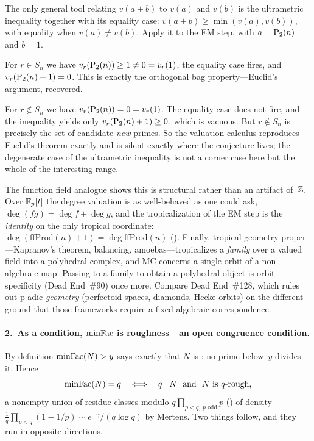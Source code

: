 \begin{remark}
\label{rem:tropical}
The only general tool relating $v(a+b)$ to $v(a)$ and $v(b)$ is the
ultrametric inequality together with its equality case:
$v(a+b) \geq \min(v(a), v(b))$, with equality when $v(a) \neq v(b)$.
Apply it to the EM step, with $a = \mathrm{P}_{2}(n)$ and $b = 1$.

For $r \in S_n$ we have $v_r(\mathrm{P}_{2}(n)) \geq 1 \neq 0 = v_r(1)$, the
equality case fires, and $v_r(\mathrm{P}_{2}(n)+1) = 0$.  This is exactly the
orthogonal bag property---Euclid's argument, recovered.

For $r \notin S_n$ we have $v_r(\mathrm{P}_{2}(n)) = 0 = v_r(1)$.  The equality
case does not fire, and the inequality yields only
$v_r(\mathrm{P}_{2}(n)+1) \geq 0$, which is vacuous.  But $r \notin S_n$ is
precisely the set of candidate \emph{new} primes.  So the valuation
calculus reproduces Euclid's theorem exactly and is silent exactly where
the conjecture lives; the degenerate case of the ultrametric inequality
is not a corner case here but the whole of the interesting range.

The function field analogue shows this is structural rather than an
artifact of~$\mathbb{Z}$.  Over $\mathbb{F}_p[t]$ the degree valuation is as
well-behaved as one could ask, $\deg(fg) = \deg f + \deg g$, and the
tropicalization of the EM step is the \emph{identity} on the only
tropical coordinate:
$\deg(\mathrm{ffProd}(n)+1) = \deg \mathrm{ffProd}(n)$
().
Finally, tropical geometry proper---Kapranov's theorem, balancing,
amoebas---tropicalizes a \emph{family} over a valued field into a
polyhedral complex, and MC concerns a single orbit of a non-algebraic
map.  Passing to a family to obtain a polyhedral object is
orbit-specificity (Dead End~\#90) once more.  Compare Dead End~\#128,
which rules out p-adic \emph{geometry} (perfectoid spaces, diamonds,
Hecke orbits) on the different ground that those frameworks require a
fixed algebraic correspondence.
\end{remark}

\paragraph{2.\ As a condition, $\mathrm{minFac}$ is roughness---an open
congruence condition.}
By definition $\mathrm{minFac}(N) > y$ says exactly that $N$ is
: no prime below~$y$ divides it.  Hence
\[
  \mathrm{minFac}(N) = q
  \quad\Longleftrightarrow\quad
  q \mid N \ \text{ and }\ N \text{ is } q\text{-rough},
\]
a nonempty union of residue classes modulo
$q \prod_{p<q,\ p \text{ odd}} p$
() of density
$\tfrac{1}{q}\prod_{p<q}(1 - 1/p) \sim e^{-\gamma}/(q\log q)$ by
Mertens.  Two things follow, and they run in opposite directions.

